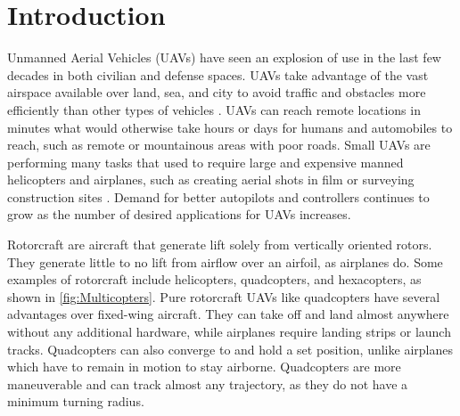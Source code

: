 \chapter{Introduction}

Unmanned Aerial Vehicles (UAVs) have seen an explosion of use in the last few decades in both civilian and defense spaces. 
UAVs take advantage of the vast airspace available over land, sea, and city to avoid traffic and obstacles more efficiently than other types of vehicles \cite{sabour2023applications}. 
UAVs can reach remote locations in minutes what would otherwise take hours or days for humans and automobiles to reach, such as remote or mountainous areas with poor roads. 
Small UAVs are performing many tasks that used to require large and expensive manned helicopters and airplanes, such as creating aerial shots in film \cite{aerial_shot} or surveying construction sites \cite{drones6050117}. 
Demand for better autopilots and controllers continues to grow as the number of desired applications for UAVs increases.


Rotorcraft are aircraft that generate lift solely from vertically oriented rotors. 
They generate little to no lift from airflow over an airfoil, as airplanes do. 
Some examples of rotorcraft include helicopters, quadcopters, and hexacopters, as shown in \ref{fig:Multicopters}. 
Pure rotorcraft UAVs like quadcopters have several advantages over fixed-wing aircraft. 
They can take off and land almost anywhere without any additional hardware, while airplanes require landing strips or launch tracks. 
Quadcopters can also converge to and hold a set position, unlike airplanes which have to remain in motion to stay airborne. 
Quadcopters are more maneuverable and can track almost any trajectory, as they do not have a minimum turning radius. 

